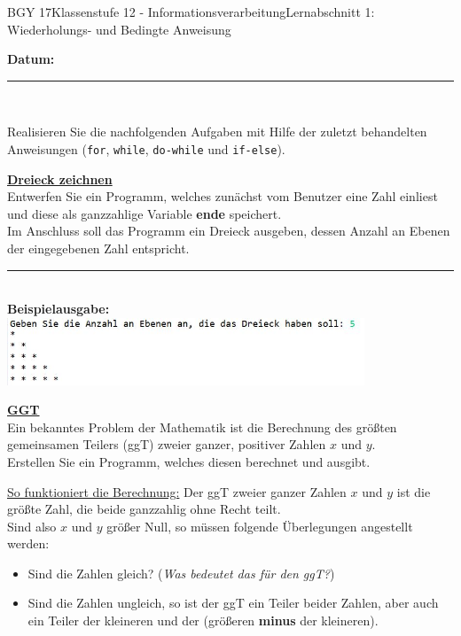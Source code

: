 \documentclass[oneside,openany,headings=optiontotoc,11pt,numbers=noenddot]{scrreprt}
\begin{document}
	\begin{worksheet}{BGY 17}{Klassenstufe 12 - Informationsverarbeitung}{Lernabschnitt 1: Wiederholungs- und Bedingte Anweisung}
				
		\noindent
		\sffamily
		\textbf{Datum:}
		\rule{0.91\textwidth}{0.4pt}\\
		\par\noindent
		Realisieren Sie die nachfolgenden Aufgaben mit Hilfe der zuletzt behandelten Anweisungen (\lstinline[style=JavaInputStyle]{for}, \lstinline[style=JavaInputStyle]{while}, \lstinline[style=JavaInputStyle]{do-while} und \lstinline[style=JavaInputStyle]{if-else}).
		\begin{framed}
			\noindent
			\textbf{\underline{Dreieck zeichnen}}\\
			Entwerfen Sie ein Programm, welches zunächst vom Benutzer eine Zahl einliest und diese als ganzzahlige Variable \textbf{ende} speichert.\\
			Im Anschluss soll das Programm ein Dreieck ausgeben, dessen Anzahl an Ebenen der eingegebenen Zahl entspricht.\\
			\rule{\textwidth}{0.1pt}\\
			\textbf{Beispielausgabe:}
			\includegraphics[width=0.8\textwidth,align=t]{../99_Bilder/20181105_A1.jpg}\\
			\par\bigskip\noindent
			\textbf{\underline{GGT}}\\
			Ein bekanntes Problem der Mathematik ist die Berechnung des größten gemeinsamen Teilers (ggT) zweier ganzer, positiver Zahlen \(x\) und \(y\).\\
			Erstellen Sie ein Programm, welches diesen berechnet und ausgibt.\\
			\begin{framed}
				\underline{So funktioniert die Berechnung:} Der ggT zweier ganzer Zahlen \(x\) und \(y\) ist die größte Zahl, die beide ganzzahlig ohne Recht teilt.\\
				Sind also \(x\) und \(y\) größer Null, so müssen folgende Überlegungen angestellt werden:
				\begin{itemize}[label=-]
					\item Sind die Zahlen gleich? (\textit{Was bedeutet das für den ggT?})
					\item Sind die Zahlen ungleich, so ist der ggT ein Teiler beider Zahlen, aber auch ein Teiler der kleineren und der (größeren \textbf{minus} der kleineren).					

\end{itemize}
\end{framed}
\end{framed}
\end{worksheet}
\end{document}
